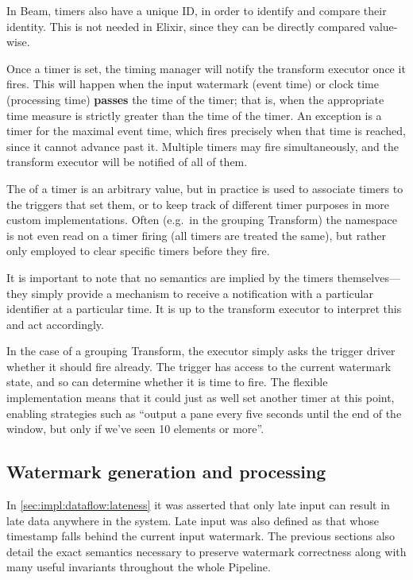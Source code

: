 \footnotetext
{
In Beam, timers also have a unique ID, in order to identify and compare their identity. This is not needed in Elixir, since they can be directly compared value-wise.
}

Once a timer is set, the timing manager will notify the transform executor once it fires.
This will happen when the input watermark (event time) or clock time (processing time) \textbf{passes} the time of the timer; that is, when the appropriate time measure is strictly greater than the time of the timer.
An exception is a timer for the maximal event time, which fires precisely when that time is reached, since it cannot advance past it.
Multiple timers may fire simultaneously, and the transform executor will be notified of all of them.

The  of a timer is an arbitrary value, but in practice is used to associate timers to the triggers that set them, or to keep track of different timer purposes in more custom implementations.
Often (e.g.\ in the grouping Transform) the namespace is not even read on a timer firing (all timers are treated the same), but rather only employed to clear specific timers before they fire.

It is important to note that no semantics are implied by the timers themselves---they simply provide a mechanism to receive a notification with a particular identifier at a particular time.
It is up to the transform executor to interpret this and act accordingly.

In the case of a grouping Transform, the executor simply asks the trigger driver whether it should fire already.
The trigger has access to the current watermark state, and so can determine whether it is time to fire.
The flexible implementation means that it could just as well set another timer at this point, enabling strategies such as ``output a pane every five seconds until the end of the window, but only if we've seen 10 elements or more''.

\subsection{Watermark generation and processing}


In \cref{sec:impl:dataflow:lateness} it was asserted that only late input can result in late data anywhere in the system.
Late input was also defined as that whose timestamp falls behind the current input watermark.
The previous sections also detail the exact semantics necessary to preserve watermark correctness along with many useful invariants throughout the whole Pipeline.

